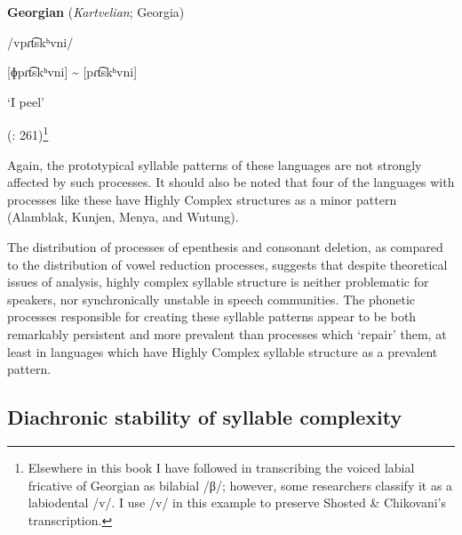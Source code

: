 \ea\label{ex:(8.8)}
  \textbf{Georgian} (\textit{Kartvelian}; Georgia)

/vpɾt͡skʰvni/

[ɸpɾt͡skʰvni] {\textasciitilde} [pɾt͡skʰvni]

\glt ‘I peel’

(\citealt{ShostedChikovani2006}: 261)\footnote{ \textrm{Elsewhere in this book I have followed \citet{Aronson1991} in transcribing the voiced labial fricative of Georgian as bilabial /β/; however, some researchers classify it as a labiodental /v/. I use /v/ in this example to preserve Shosted \& Chikovani’s transcription.}}
\z

Again, the prototypical syllable patterns of these languages are not strongly affected by such processes. It should also be noted that four of the languages with processes like these have Highly Complex structures as a minor pattern (Alamblak, Kunjen, Menya, and Wutung).

  The distribution of processes of epenthesis and consonant deletion, as compared to the distribution of vowel reduction processes, suggests that despite theoretical issues of analysis, highly complex syllable structure is neither problematic for speakers, nor synchronically unstable in speech communities. The phonetic processes responsible for creating these syllable patterns appear to be both remarkably persistent and more prevalent than processes which ‘repair’ them, at least in languages which have Highly Complex syllable structure as a prevalent pattern.

\subsection{Diachronic stability of syllable complexity}\label{sec:8.5.2}


